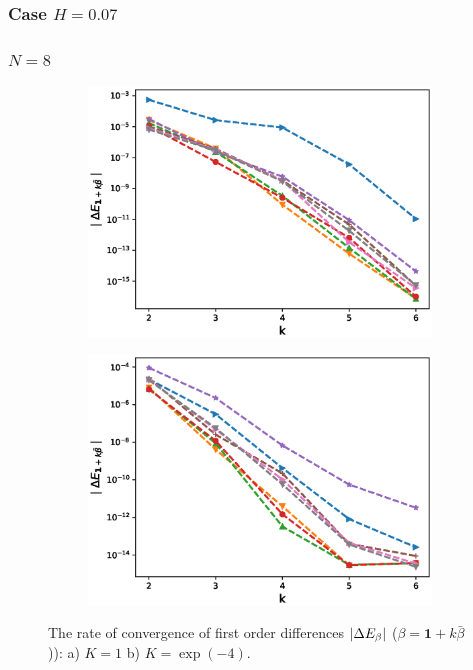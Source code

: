 \documentclass[11pt]{article}
\begin{document}
\newpage
\subsubsection*{Case $H=0.07$}
\subsubsection*{$N=8$ }

\begin{figure}[h!]
	\centering
	\begin{subfigure}{.5\textwidth}
		\centering
		\includegraphics[width=1\linewidth]{./figures/mixed_diff_second_way/H_007/N_8/first_difference_rbergomi_8steps_H_007_K_1.eps}
		\caption{}
		\label{fig:sub3}
	\end{subfigure}%
	\begin{subfigure}{.5\textwidth}
		\centering
		\includegraphics[width=1\linewidth]{./figures/mixed_diff_second_way/H_007/N_8/first_difference_rbergomi_8steps_H_007_K_exp__4.eps}
		\caption{}
		\label{fig:sub4}
	\end{subfigure}
	
	\caption{The rate of convergence of  first order differences $\left\lvert\Delta E_{\beta}\right\rvert$ ($\beta=\mathbf{1}+k \bar{\beta}$)): a) $K=1$ b)  $K=\operatorname{exp}(-4).$}
	\label{fig:test2}
\end{figure}
\end{document}
